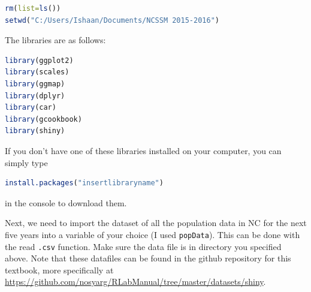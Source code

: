 \begin{lstlisting}[language = R]
rm(list=ls())
setwd("C:/Users/Ishaan/Documents/NCSSM 2015-2016")
\end{lstlisting}

\noindent The libraries are as follows:

\begin{lstlisting}[language = R]
library(ggplot2)
library(scales)
library(ggmap)
library(dplyr)
library(car)
library(gcookbook)
library(shiny)
\end{lstlisting}


\noindent If you don't have one of these libraries installed on your computer, you can simply type 
\begin{lstlisting}[language = R]
install.packages("insertlibraryname") 
\end{lstlisting}
in the console to download them. 

\noindent Next, we need to import the dataset of all the population data in NC for the next five years into a variable of your choice (I used \texttt{popData}).
This can be done with the read \texttt{.csv} function.
Make sure the data file is in directory you specified above.
Note that these datafiles can be found in the github repository for this textbook, more specifically at \url{https://github.com/nosyarg/RLabManual/tree/master/datasets/shiny}.

